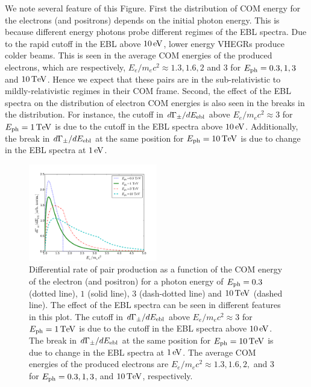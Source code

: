 \documentclass[usenatbib,iop,apj,numberedappendix]{aeb_emulateapj_2015}
\def\eV{{\rm eV}} %
\def\TeV{{\rm T}\eV} %
\begin{document}
We note several feature of this Figure.  First the distribution of COM energy for the electrons (and positrons) depends on the initial photon energy. This is because different energy photons probe different regimes of the EBL spectra.  Due to the rapid cutoff in the EBL above $10\,\eV$, lower energy VHEGRs produce colder beams.  This is seen in the average COM energies of the produced electrons, which are respectively, $E_e/m_e c^2 \approx 1.3, 1.6, 2$ and $3$ for $E_{\rm ph} = 0.3, 1, 3$ and $10\,\TeV$. Hence we expect that these pairs are in the sub-relativistic to mildly-relativistic regimes in their COM frame.
Second, the effect of the EBL spectra on the distribution of electron COM energies is also seen in the breaks in the distribution.  For instance, the cutoff in $d\Gamma_{\pm}/dE_{\rm ebl}$ above $E_e/m_e c^2 \approx 3$ for $E_{\rm ph} = 1\,\TeV$ is due to the cutoff in the EBL spectra above $10\,\eV$.  Additionally, the break in $d\Gamma_{\pm}/dE_{\rm ebl}$ at the same position for $E_{\rm ph} = 10\,\TeV$ is due to change in the EBL spectra at $1\,\eV$.  

\begin{figure}
 \includegraphics[width=0.5\textwidth]{rates.pdf}
 \caption{Differential rate of pair production as a function of the COM energy of the electron (and positron) for a photon energy of $E_{\rm ph} = 0.3$ (dotted line), $1$ (solid line), $3$ (dash-dotted line) and $10\,\TeV$ (dashed line).  The effect of the EBL spectra can be seen in different features in this plot.  The cutoff in $d\Gamma_{\pm}/dE_{\rm ebl}$ above $E_e/m_e c^2 \approx 3$ for $E_{\rm ph} = 1\,\TeV$ is due to the cutoff in the EBL spectra above $10\,\eV$.  The break in $d\Gamma_{\pm}/dE_{\rm ebl}$ at the same position for $E_{\rm ph} = 10\,\TeV$ is due to change in the EBL spectra at $1\,\eV$. The average COM energies of the produced electrons are $E_e/m_e c^2 \approx 1.3, 1.6, 2,$ and $3$ for $E_{\rm ph} = 0.3, 1, 3$, and $10\,\TeV$, respectively.  
 \label{fig:rates}}
\end{figure}
\end{document}
